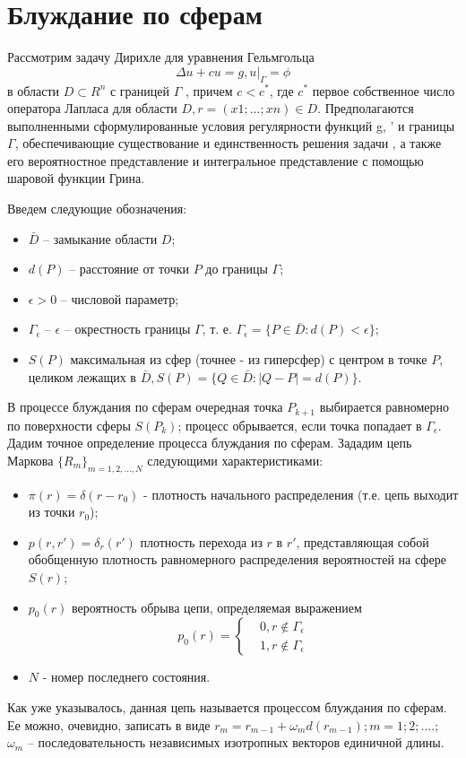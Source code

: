 \section{Блуждание по сферам}
Рассмотрим задачу Дирихле для уравнения Гельмгольца
\begin{equation} \Delta u + cu = g,	 u|_{\Gamma} = \phi \end{equation}
в области $D \subset R^{n}$ с границей $\Gamma$ , причем $c < c^{*}$, где $c^{*}$ первое собственное число оператора Лапласа для области $D, r = (x1;\dots; xn) \in D$. Предполагаются выполненными сформулированные условия регулярности функций g, ' и границы $\Gamma$, обеспечивающие существование и единственность решения задачи , а также его вероятностное представление и интегральное представление с помощью шаровой функции Грина.

Введем следующие обозначения:
\begin{itemize}
	\item $\bar{D}$  -- замыкание области $D$;
	\item $d(P)$ -- расстояние от точки $P$ до границы $\Gamma$;
	\item $\epsilon > 0 $ -- числовой параметр;
	\item $\Gamma_{\epsilon }$ -- $\epsilon$ -- окрестность границы $\Gamma$, т. е. $ \Gamma_{\epsilon }=\{ P \in \bar{D}:d(P) < \epsilon \} $;
	\item $S(P)$  максимальная из сфер (точнее - из гиперсфер) с центром в точке $P$, целиком лежащих в $\bar{D}, S(P) = \{Q \in \bar{D}: |Q - P| = d(P)\}$.
\end{itemize}

В процессе блуждания по сферам очередная точка $P_{k+1}$ выбирается равномерно по поверхности сферы $S(P_{k})$; процесс обрывается, если точка попадает в $ \Gamma_{\epsilon }$. Дадим точное определение процесса блуждания по сферам. Зададим цепь Маркова $\{R_{m}\}_{m=1,2,\dots,N} $ следующими характеристиками:\begin{itemize}
	\item $\pi (r) = \delta(r-r_{0})$ - плотность начального распределения (т.е. цепь выходит из точки $r_0$);
	\item $p(r,r') = \delta_{r}(r') $ плотность перехода из $r$ в $r'$, представляющая собой обобщенную плотность равномерного распределения вероятностей на сфере $S(r)$;
	\item $p_{0}(r)$ вероятность обрыва цепи, определяемая выражением \begin{equation} p_{0}(r)= 
	\left\{
\begin{aligned}
& 0, r \notin \Gamma_{\epsilon}\\ & 1, r\notin \Gamma_{\epsilon}
\end{aligned}
 \right. \end{equation}
\item{}$N$ - номер последнего состояния.
\end{itemize}
Как уже указывалось, данная цепь называется процессом блуждания по сферам. Ее можно, очевидно, записать в виде $r_{m} = r_{m-1} + \omega_{m}d(r_{m-1}); m = 1; 2;....;$
$\omega_{m}$ -- последовательность независимых изотропных векторов единичной
 длины.
